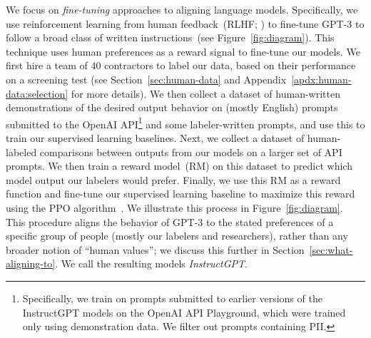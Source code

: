 \documentclass{article}
\begin{document}
We focus on \emph{fine-tuning} approaches to aligning language models. Specifically, we use reinforcement learning from human feedback~(RLHF; \citealp{christiano2017deep,stiennon2020learning}) to fine-tune GPT-3 to follow a broad class of written instructions~(see Figure~\ref{fig:diagram}). This technique uses human preferences as a reward signal to fine-tune our models. We first hire a team of 40 contractors to label our data, based on their performance on a screening test (see Section~\ref{sec:human-data} and Appendix~\ref{apdx:human-data:selection} for more details).
We then collect a dataset of human-written demonstrations of the desired output behavior on (mostly English) prompts submitted to the OpenAI API\footnote{Specifically, we train on prompts submitted to earlier versions of the InstructGPT models on the OpenAI API Playground, which were trained only using demonstration data. We filter out prompts containing PII.} and some labeler-written prompts, and use this to train our supervised learning baselines. Next, we collect a dataset of human-labeled comparisons between outputs from our models on a larger set of API prompts. We then train a reward model~(RM) on this dataset to predict which model output our labelers would prefer. Finally, we use this RM as a reward function and fine-tune our supervised learning baseline to maximize this reward using the PPO algorithm~\citep{schulman2017proximal}. We illustrate this process in Figure~\ref{fig:diagram}. This procedure aligns the behavior of GPT-3 to the stated preferences of a specific group of people (mostly our labelers and researchers),  rather than any broader notion of ``human values''; we discuss this further in Section~\ref{sec:what-aligning-to}.  We call the resulting models \textit{InstructGPT}. 
\end{document}

